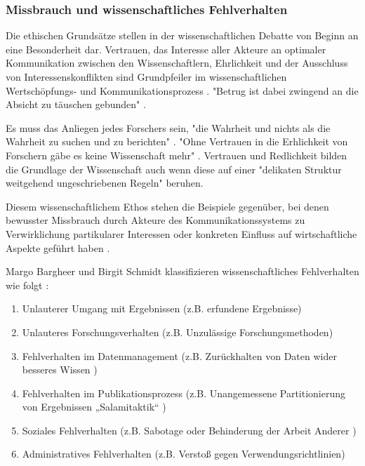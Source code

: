 \subsubsection{Missbrauch und wissenschaftliches Fehlverhalten}

Die ethischen Grundsätze stellen in der wissenschaftlichen Debatte von Beginn an eine Besonderheit dar. Vertrauen, das Interesse aller Akteure an optimaler Kommunikation zwischen den Wissenschaftlern, Ehrlichkeit und der Ausschluss von Interessenskonflikten sind Grundpfeiler im wissenschaftlichen Wertschöpfungs- und Kommunikationsprozess \cite{Bargheer_2015}. "Betrug ist dabei zwingend an die Absicht zu täuschen gebunden" \cite{Luescher_2014}.

Es muss das Anliegen jedes Forschers sein, "die Wahrheit und nichts als die Wahrheit zu suchen und zu berichten" \cite{Luescher_2014}. "Ohne Vertrauen in die Erhlichkeit von Forschern gäbe es keine Wissenschaft mehr" \cite{hagner_2015_sache_buches}. Vertrauen und Redlichkeit bilden die Grundlage der Wissenschaft \cite{Bargheer_2015} auch wenn diese auf einer "delikaten Struktur weitgehend ungeschriebenen Regeln" \cite{grand_2012_open} beruhen.

Diesem wissenschaftlichem Ethos stehen die Beispiele gegenüber, bei denen bewusster Missbrauch durch Akteure des Kommunikationssystems zu Verwirklichung partikularer Interessen oder konkreten Einfluss auf wirtschaftliche Aspekte geführt haben \cite{Luescher_2014}  \cite{binswanger_2014_excellence} \cite{Beall_2012}.

Margo Bargheer und Birgit Schmidt klassifizieren wissenschaftliches Fehlverhalten wie folgt \cite{Bargheer_2015}:
\begin{enumerate}
\item Unlauterer Umgang mit Ergebnissen (z.B. erfundene Ergebnisse)
\item Unlauteres Forschungsverhalten (z.B. Unzulässige Forschungsmethoden)
\item Fehlverhalten im Datenmanagement (z.B. Zurückhalten von Daten wider besseres Wissen )
\item Fehlverhalten im Publikationsprozess (z.B. Unangemessene Partitionierung von Ergebnissen „Salamitaktik“  \cite{binswanger_2014_excellence})
\item Soziales Fehlverhalten (z.B. Sabotage oder Behinderung der Arbeit Anderer )
\item Administratives Fehlverhalten (z.B. Verstoß gegen Verwendungsrichtlinien)
\end{enumerate}

